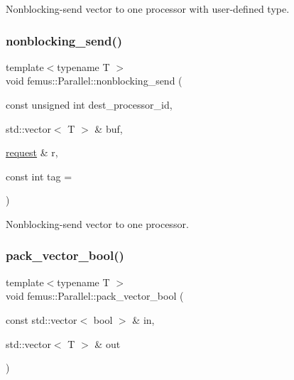 Nonblocking-\/send vector to one processor with user-\/defined type. \mbox{\label{namespacefemus_1_1_parallel_a017efec3821f7b00b3a6839648a751d8}} 
\subsubsection{\texorpdfstring{nonblocking\+\_\+send()}{nonblocking\_send()}\hspace{0.1cm}{\footnotesize\ttfamily [2/2]}}
{\footnotesize\ttfamily template$<$typename T $>$ \\
void femus\+::\+Parallel\+::nonblocking\+\_\+send (\begin{DoxyParamCaption}\item[{const unsigned int}]{dest\+\_\+processor\+\_\+id,  }\item[{std\+::vector$<$ T $>$ \&}]{buf,  }\item[{\mbox{\hyperlink{structfemus_1_1_parallel_1_1request}{request}} \&}]{r,  }\item[{const int}]{tag = {} }\end{DoxyParamCaption})\hspace{0.3cm}{\ttfamily [inline]}}

Nonblocking-\/send vector to one processor. \mbox{\label{namespacefemus_1_1_parallel_aeda20f4be32ce099559f7e48615b212a}} 
\subsubsection{\texorpdfstring{pack\+\_\+vector\+\_\+bool()}{pack\_vector\_bool()}}
{\footnotesize\ttfamily template$<$typename T $>$ \\
void femus\+::\+Parallel\+::pack\+\_\+vector\+\_\+bool (\begin{DoxyParamCaption}\item[{const std\+::vector$<$ bool $>$ \&}]{in,  }\item[{std\+::vector$<$ T $>$ \&}]{out }\end{DoxyParamCaption})\hspace{0.3cm}{\ttfamily [inline]}}

